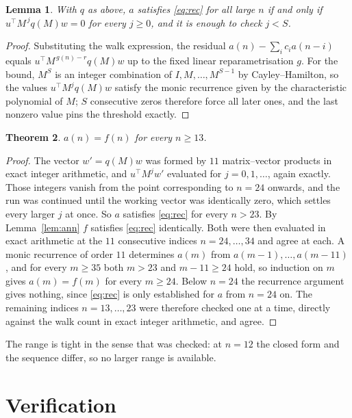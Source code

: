 \documentclass[11pt,a4paper]{article}
\theoremstyle{plain}
\newtheorem{theorem}{Theorem}
\newtheorem{lemma}[theorem]{Lemma}
\theoremstyle{definition}
\begin{document}
\begin{lemma}\label{lem:crit}
With $q$ as above, $a$ satisfies \eqref{eq:rec} for all large $n$ if and only if
$u^{\!\top}M^{\,j}q(M)w=0$ for every $j\ge0$, and it is enough to check $j<S$.
\end{lemma}

\begin{proof}
Substituting the walk expression, the residual $a(n)-\sum_ic_ia(n-i)$ equals
$u^{\!\top}M^{\,g(n)-r}q(M)w$ up to the fixed linear reparametrisation $g$. For the bound,
$M^{S}$ is an integer combination of $I,M,\dots,M^{S-1}$ by Cayley--Hamilton, so the values
$u^{\!\top}M^{j}q(M)w$ satisfy the monic recurrence given by the characteristic polynomial of
$M$; $S$ consecutive zeros therefore force all later ones, and the last nonzero value pins the
threshold exactly.
\end{proof}

\begin{theorem}
$a(n)=f(n)$ for every $n\ge13$.
\end{theorem}

\begin{proof}
The vector $w'=q(M)w$ was formed by $11$ matrix--vector products in exact integer
arithmetic, and $u^{\!\top}M^{j}w'$ evaluated for $j=0,1,\dots$, again exactly. Those integers
vanish from the point corresponding to $n=24$ onwards, and the run was continued until the
working vector was identically zero, which settles every larger $j$ at once. So $a$ satisfies
\eqref{eq:rec} for every $n>23$. By Lemma~\ref{lem:ann} $f$ satisfies \eqref{eq:rec}
identically. Both were then evaluated in exact arithmetic at the $11$ consecutive indices
$n=24,\dots,34$ and agree at each. A monic recurrence of order $11$
determines $a(m)$ from $a(m-1),\dots,a(m-11)$, and for every $m\ge35$ both
$m>23$ and $m-11\ge24$ hold, so induction on $m$ gives $a(m)=f(m)$ for every
$m\ge24$.
Below $n=24$ the recurrence argument gives nothing, since \eqref{eq:rec} is only
established for $a$ from $n=24$ on. The remaining indices $n=13,\dots,23$ were
therefore checked one at a time, directly against the walk count in exact integer arithmetic,
and agree.
\end{proof}

The range is tight in the sense that was checked: at $n=12$ the closed form and the sequence differ, so no larger range is available.

\section{Verification}
\end{document}

